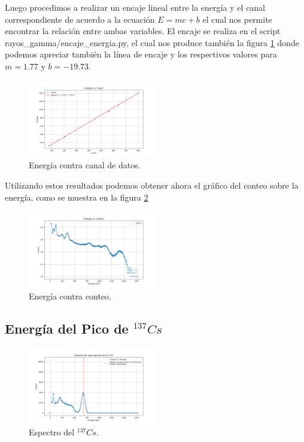 \documentclass[twocolumn,a4paper,11pt]{scrartcl}
\begin{document}
Luego procedimos a realizar un encaje lineal entre la energía y el canal correspondiente de acuerdo a la ecuación $E = mc +b$ el cual nos permite encontrar la relación entre ambas variables. El encaje se realiza en el script rayos\_gamma/encaje\_energia.py, el cual nos produce también la figura \ref{fig:energia_canal_graph} donde podemos apreciar también la línea de encaje y los respectivos valores para $m = 1.77$ y $b = -19.73$.

\begin{figure}[]
  \includegraphics[width=0.50\textwidth]{energy_vs_canal.png}
  \caption{Energía contra canal de datos.}
  \label{fig:energia_canal_graph}
\end{figure}

Utilizando estos resultados podemos obtener ahora el gráfico del conteo sobre la energía, como se muestra en la figura \ref{fig:energia_conteo_graph} 

\begin{figure}[]
  \includegraphics[width=0.50\textwidth]{energia_vs_conteo_eu-152.png}
  \caption{Energía contra conteo.}
  \label{fig:energia_conteo_graph}
\end{figure}

\subsection*{Energía del Pico de $^{137}Cs$}

\begin{figure}[h]
  \includegraphics[width=0.50\textwidth]{plot_cs137.png}
  \caption{Espectro del $^{137}Cs$.}
  \label{fig:espectro_cs}
\end{figure}
\end{document}
